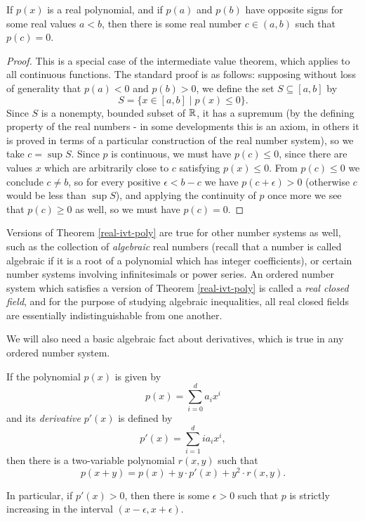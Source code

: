 \begin{thm}\label{real-ivt-poly} If $p(x)$ is a real polynomial, and if $p(a)$ and $p(b)$ have opposite signs for some real values $a < b$, then there is some real number $c \in (a,b)$ such that $p(c) = 0$.
\end{thm}
\begin{proof} This is a special case of the intermediate value theorem, which applies to all continuous functions. The standard proof is as follows: supposing without loss of generality that $p(a) < 0$ and $p(b) > 0$, we define the set $S \subseteq [a,b]$ by
\[
S = \{x \in [a,b] \mid p(x) \le 0\}.
\]
Since $S$ is a nonempty, bounded subset of $\mathbb{R}$, it has a supremum (by the defining property of the real numbers - in some developments this is an axiom, in others it is proved in terms of a particular construction of the real number system), so we take $c = \sup S$. Since $p$ is continuous, we must have $p(c) \le 0$, since there are values $x$ which are arbitrarily close to $c$ satisfying $p(x) \le 0$. From $p(c) \le 0$ we conclude $c \ne b$, so for every positive $\epsilon < b-c$ we have $p(c+\epsilon) > 0$ (otherwise $c$ would be less than $\sup S$), and applying the continuity of $p$ once more we see that $p(c) \ge 0$ as well, so we must have $p(c) = 0$.
\end{proof}

Versions of Theorem \ref{real-ivt-poly} are true for other number systems as well, such as the collection of \emph{algebraic} real numbers (recall that a number is called algebraic if it is a root of a polynomial which has integer coefficients), or certain number systems involving infinitesimals or power series. An ordered number system which satisfies a version of Theorem \ref{real-ivt-poly} is called a \emph{real closed field}, and for the purpose of studying algebraic inequalities, all real closed fields are essentially indistinguishable from one another.

We will also need a basic algebraic fact about derivatives, which is true in any ordered number system.

\begin{prop} If the polynomial $p(x)$ is given by
\[
p(x) = \sum_{i=0}^d a_i x^i
\]
and its \emph{derivative} $p'(x)$ is defined by
\[
p'(x) = \sum_{i=1}^{d} ia_i x^i,
\]
then there is a two-variable polynomial $r(x,y)$ such that
\[
p(x + y) = p(x) + y\cdot p'(x) + y^2\cdot r(x,y).
\]

In particular, if $p'(x) > 0$, then there is some $\epsilon > 0$ such that $p$ is strictly increasing in the interval $(x-\epsilon, x+\epsilon)$.
\end{prop}

